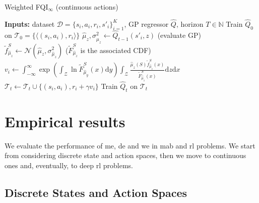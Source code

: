 \begin{algorithm}[t]
\caption{Weighted FQI$_{\infty}$ (continuous actions)}
\label{A:continuousWFQI}
\begin{small}
\begin{algorithmic} 
\STATE \textbf{Inputs:} dataset $\mathcal{D}=\{s_i,a_i,r_i,s'_i\}_{i=1}^{K}$, GP regressor $\widehat{Q}$, horizon $T \in \mathbb{N}$
\STATE Train $\widehat{Q}_0$ on $\mathcal{T}_0 = \{\langle (s_i, a_i), r_i\rangle \}$
\STATE $\hat{\mu}_{z}, \sigma^2_{\hat{\mu}_{z}} \leftarrow \widehat{Q}_{t-1}(s'_i, z)$ (evaluate GP)
\STATE $\tilde{f}_{\hat{\mu}_z}^S \leftarrow \mathcal{N}(\hat{\mu}_{z}, \sigma^2_{\hat{\mu}_z})$ ($\tilde{F}_{\hat{\mu}_z}^S$ is the associated CDF) 
\STATE $v_i \leftarrow \int_{-\infty}^{\infty} \exp{\left( \int_{\mathcal{Z}} \ln \tilde{F}_{\hat{\mu}_y}^S(x)\mathrm{d}y \right)} \int_{\mathcal{Z}}  \frac{\hat{\mu}_z(S)  \tilde{f}_{\hat{\mu}_z}^S(x)}{\tilde{F}_{\hat{\mu}_z}^S(x)} \mathrm{d}z\mathrm{d}x$
\STATE $\mathcal{T}_t \leftarrow \mathcal{T}_t \cup \{(s_i,a_i), r_i + \gamma v_i\}$
\ENDFOR
\STATE Train $\widehat{Q}_t$ on $\mathcal{T}_t$
\ENDFOR
\end{algorithmic}
\end{small}
\end{algorithm}

\section{Empirical results}
We evaluate the performance of \gls{me}, \gls{de} and \gls{we} in \gls{mab} and \gls{rl} problems. We start from considering discrete state and action spaces, then we move to continuous ones and, eventually, to deep \gls{rl} problems.

\subsection{Discrete States and Action Spaces}

